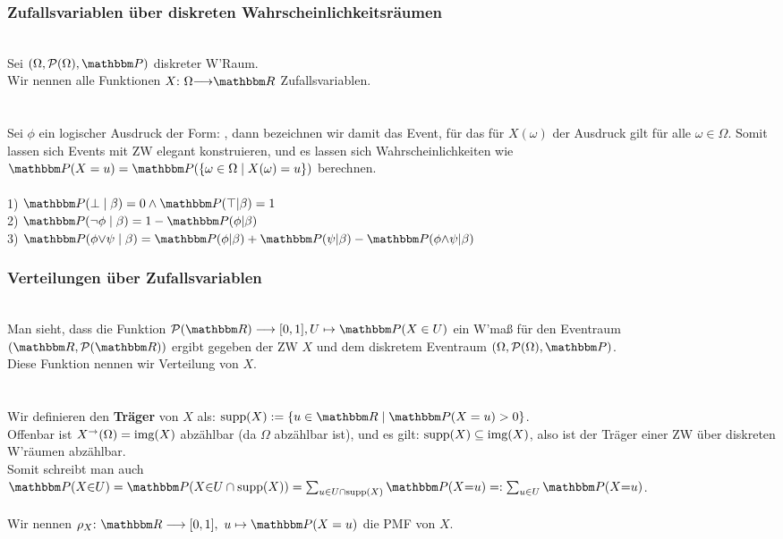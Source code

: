 \subsubsection*{Zufallsvariablen über diskreten Wahrscheinlichkeitsräumen}
 \\
Sei \((\Omega, \pro(\Omega), \Pro)\) diskreter W'Raum. \\
Wir nennen alle Funktionen \(X\QDp \Omega {\longrightarrow} \R\) Zufallsvariablen. \\ \\
 \\
Sei \(\phi\) ein logischer Ausdruck der Form: , dann bezeichnen wir damit das Event, für das für \(X(\omega)\) der Ausdruck gilt für alle \(\omega \in \Omega\). Somit lassen sich Events mit ZW elegant konstruieren, und es lassen sich Wahrscheinlichkeiten wie \(\Pro(X = u) = \Pro(\{{\omega \in \Omega} \mid {X(\omega) = u}\})\) berechnen. \pagebreak \\
 \\
1) \(\Pro(\bot \mid \beta) = 0 \wedge \Pro(\top|\beta) = 1\) \\
2) \(\Pro(\neg\phi \mid \beta) = 1 - \Pro(\phi|\beta)\) \\
3) \(\Pro(\phi {\vee} \psi \mid \beta) = \Pro(\phi| \beta) + \Pro(\psi| \beta) - \Pro(\phi {\wedge} \psi| \beta)\)
\subsubsection*{Verteilungen über Zufallsvariablen}
 \\
Man sieht, dass die Funktion \(\mathcal P(\R) \longrightarrow [0,1], U \mapsto \Pro(X \in U)\) ein W'maß für den Eventraum \((\R, \mathcal P(\R))\) ergibt gegeben der ZW \(X\) und dem diskretem Eventraum \((\Omega, \mathcal P(\Omega), \Pro)\). \\ Diese Funktion nennen wir Verteilung von \(X\). \\ \\
 \\
Wir definieren den \textbf{Träger} von \(X\) als: \(\supp(X) := \{{u \in \R} \mid {\Pro(X=u) > 0}\}\). \\
Offenbar ist \(X^\rightarrow(\Omega) = \text{img}(X)\) abzählbar (da \(\Omega\) abzählbar ist), und es gilt: \(\text{supp}(X) \subseteq \text{img}(X)\), also ist der Träger einer ZW über diskreten W'räumen abzählbar. \\
Somit schreibt man auch \(\Pro(X {\in} U) = \Pro(X {\in} {U \cap \supp(X)}) = \sum_{u \in U \cap \supp(X)}\Pro(X {=} u) =: \sum_{u \in U}\Pro(X {=} u)\). \\ \\
Wir nennen \(\rho_X \QDp \R \longrightarrow [0,1],\gap u \mapsto \Pro(X = u)\) die PMF von \(X\).
